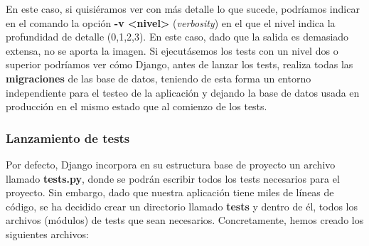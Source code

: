 En este caso, si quisiéramos ver con más detalle lo que sucede, podríamos indicar en el
comando la opción \textbf{-v <nivel>} (\textit{verbosity}) en el que el nivel indica la
profundidad de detalle (0,1,2,3). En este caso, dado que la salida es demasiado extensa,
no se aporta la imagen. Si ejecutásemos los tests con un nivel dos o superior podríamos
ver cómo Django, antes de lanzar los tests, realiza todas las \textbf{migraciones} de las
base de datos, teniendo de esta forma un entorno independiente para el testeo de la
aplicación y dejando la base de datos usada en producción en el mismo estado que al
comienzo de los tests.\\

\subsubsection{Lanzamiento de tests}
Por defecto, Django incorpora en su estructura base de proyecto un archivo llamado
\textbf{tests.py}, donde se podrán escribir todos los tests necesarios para el proyecto.
Sin embargo, dado que nuestra aplicación tiene miles de líneas de código, se ha decidido
crear un directorio llamado \textbf{tests} y dentro de él, todos los archivos (módulos) de
tests que sean necesarios. Concretamente, hemos creado los siguientes archivos:

